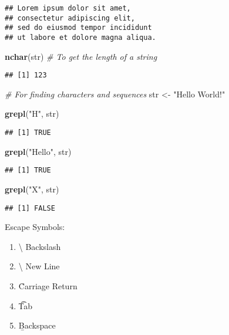 \documentclass[
]{article}
\newenvironment{Shaded}{\begin{snugshade}}{\end{snugshade}}
\newcommand{\CommentTok}[1]{\textcolor[rgb]{0.56,0.35,0.01}{\textit{#1}}}
\newcommand{\FunctionTok}[1]{\textcolor[rgb]{0.13,0.29,0.53}{\textbf{#1}}}
\newcommand{\NormalTok}[1]{#1}
\newcommand{\OtherTok}[1]{\textcolor[rgb]{0.56,0.35,0.01}{#1}}
\newcommand{\StringTok}[1]{\textcolor[rgb]{0.31,0.60,0.02}{#1}}
\providecommand{\tightlist}{%
  \setlength{\itemsep}{0pt}\setlength{\parskip}{0pt}}
\begin{document}
\begin{verbatim}
## Lorem ipsum dolor sit amet,
## consectetur adipiscing elit,
## sed do eiusmod tempor incididunt
## ut labore et dolore magna aliqua.
\end{verbatim}

\begin{Shaded}
\begin{Highlighting}[]
\FunctionTok{nchar}\NormalTok{(str) }\CommentTok{\# To get the length of a string}
\end{Highlighting}
\end{Shaded}

\begin{verbatim}
## [1] 123
\end{verbatim}

\begin{Shaded}
\begin{Highlighting}[]
\CommentTok{\# For finding characters and sequences}
\NormalTok{str }\OtherTok{\textless{}{-}} \StringTok{"Hello World!"}

\FunctionTok{grepl}\NormalTok{(}\StringTok{"H"}\NormalTok{, str)}
\end{Highlighting}
\end{Shaded}

\begin{verbatim}
## [1] TRUE
\end{verbatim}

\begin{Shaded}
\begin{Highlighting}[]
\FunctionTok{grepl}\NormalTok{(}\StringTok{"Hello"}\NormalTok{, str)}
\end{Highlighting}
\end{Shaded}

\begin{verbatim}
## [1] TRUE
\end{verbatim}

\begin{Shaded}
\begin{Highlighting}[]
\FunctionTok{grepl}\NormalTok{(}\StringTok{"X"}\NormalTok{, str)}
\end{Highlighting}
\end{Shaded}

\begin{verbatim}
## [1] FALSE
\end{verbatim}

Escape Symbols:

\begin{enumerate}
\def\labelenumi{\arabic{enumi}.}
\tightlist
\item
  \textbackslash{} Backslash
\item
  \textbackslash{} New Line
\item
  \r   Carriage Return
\item
  \t   Tab
\item
  \b   Backspace
\end{enumerate}
\end{document}

